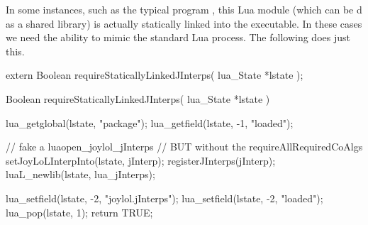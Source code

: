 In some instances, such as the typical  program 
, this Lua module (which can be d as a 
shared library) is actually statically linked into the executable. In 
these cases we need the ability to mimic the standard Lua  
process. The following  does just this. 

\startCHeader
extern Boolean requireStaticallyLinkedJInterps(
  lua_State *lstate
);
\stopCHeader

\startCCode
Boolean requireStaticallyLinkedJInterps(
  lua_State *lstate
) {
  lua_getglobal(lstate, "package");
  lua_getfield(lstate, -1, "loaded");
  
  // fake a luaopen_joylol_jInterps 
  // BUT without the requireAllRequiredCoAlgs
  setJoyLoLInterpInto(lstate, jInterp);
  registerJInterps(jInterp);
  luaL_newlib(lstate, lua_jInterps);
  
  lua_setfield(lstate, -2, "joylol.jInterps");
  lua_setfield(lstate, -2, "loaded");
  lua_pop(lstate, 1);
  return TRUE;
}
\stopCCode
